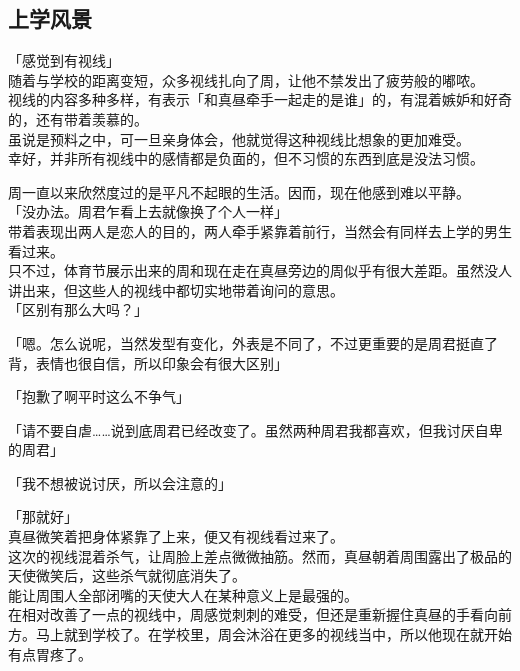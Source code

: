 \subsection{上学风景}

「感觉到有视线」\\

随着与学校的距离变短，众多视线扎向了周，让他不禁发出了疲劳般的嘟哝。\\

视线的内容多种多样，有表示「和真昼牵手一起走的是谁」的，有混着嫉妒和好奇的，还有带着羡慕的。\\

虽说是预料之中，可一旦亲身体会，他就觉得这种视线比想象的更加难受。\\

幸好，并非所有视线中的感情都是负面的，但不习惯的东西到底是没法习惯。

周一直以来欣然度过的是平凡不起眼的生活。因而，现在他感到难以平静。\\

「没办法。周君乍看上去就像换了个人一样」\\

带着表现出两人是恋人的目的，两人牵手紧靠着前行，当然会有同样去上学的男生看过来。\\

只不过，体育节展示出来的周和现在走在真昼旁边的周似乎有很大差距。虽然没人讲出来，但这些人的视线中都切实地带着询问的意思。\\

「区别有那么大吗？」

「嗯。怎么说呢，当然发型有变化，外表是不同了，不过更重要的是周君挺直了背，表情也很自信，所以印象会有很大区别」

「抱歉了啊平时这么不争气」

「请不要自虐……说到底周君已经改变了。虽然两种周君我都喜欢，但我讨厌自卑的周君」

「我不想被说讨厌，所以会注意的」

「那就好」\\

真昼微笑着把身体紧靠了上来，便又有视线看过来了。\\

这次的视线混着杀气，让周脸上差点微微抽筋。然而，真昼朝着周围露出了极品的天使微笑后，这些杀气就彻底消失了。\\

能让周围人全部闭嘴的天使大人在某种意义上是最强的。\\

在相对改善了一点的视线中，周感觉刺刺的难受，但还是重新握住真昼的手看向前方。马上就到学校了。在学校里，周会沐浴在更多的视线当中，所以他现在就开始有点胃疼了。\\

